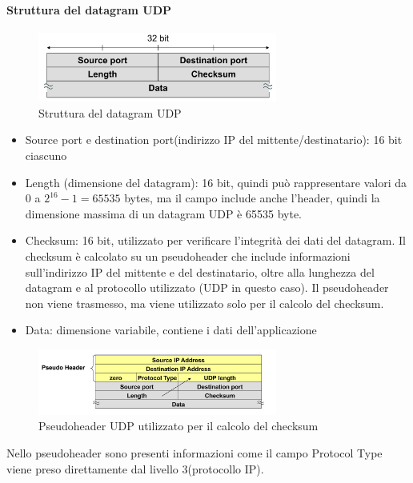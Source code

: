 \paragraph{Struttura del datagram UDP}

\begin{figure}[h!]
    \centering
    \includegraphics[width=0.7\textwidth]{images/datagram_udp.png}
    \caption{Struttura del datagram UDP}
    \label{fig:datagramudp}
\end{figure}

\begin{itemize}
    \item Source port e destination port(indirizzo IP del mittente/destinatario): 16 bit ciascuno
    \item Length (dimensione del datagram): 16 bit, quindi può rappresentare valori da 0 a $2^{16}-1 = 65535$ bytes, ma il campo include anche l'header, quindi la dimensione massima di un datagram UDP è 65535 byte.
    \item Checksum: 16 bit, utilizzato per verificare l'integrità dei dati del datagram. Il checksum è calcolato su un pseudoheader che include informazioni sull'indirizzo IP del mittente e del destinatario, oltre alla lunghezza del datagram e al protocollo utilizzato (UDP in questo caso). Il pseudoheader non viene trasmesso, ma viene utilizzato solo per il calcolo del checksum. 
    \item Data: dimensione variabile, contiene i dati dell'applicazione
\end{itemize}


\begin{figure}[h!]
    \centering
    \includegraphics[width=0.7\textwidth]{images/pseudoheaderUDP.png}
    \caption{Pseudoheader UDP utilizzato per il calcolo del checksum}
    \label{fig:psudoheaderudp}
\end{figure}

Nello pseudoheader sono presenti informazioni come il campo Protocol Type viene preso direttamente dal livello 3(protocollo IP).

